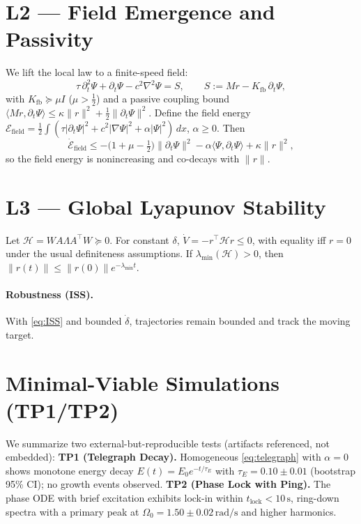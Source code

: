 \documentclass[12pt,a4paper]{article}
\begin{document}
\section{L2 --- Field Emergence and Passivity}
We lift the local law to a finite-speed field:
\begin{equation}\label{eq:telegraph}
\boxed{\tau\,\partial_t^2\Psi + \partial_t\Psi - c^2\nabla^2\Psi = S,\qquad
S:= M r - K_{\mathrm{fb}}\,\partial_t\Psi,}
\end{equation}
with \(K_{\mathrm{fb}}\succeq\mu I\) (\(\mu>\tfrac12\)) and a passive coupling bound
\(\langle Mr,\partial_t\Psi\rangle\le \kappa\|r\|^2 + \tfrac12\|\partial_t\Psi\|^2\).
Define the field energy
\(\mathcal{E}_{\text{field}}=\tfrac12\int(\tau|\partial_t\Psi|^2+c^2|\nabla\Psi|^2+\alpha|\Psi|^2)\,dx\), \(\alpha\ge0\).
Then
\begin{equation}
\dot{\mathcal{E}}_{\text{field}}\le -\big(1+\mu-\tfrac12\big)\|\partial_t\Psi\|^2 - \alpha\langle\Psi,\partial_t\Psi\rangle + \kappa\|r\|^2,
\end{equation}
so the field energy is nonincreasing and co-decays with \(\|r\|\).

\section{L3 --- Global Lyapunov Stability}
Let \(\mathcal{H}=W A \Lambda A^\top W\succeq0\). For constant \(\delta\),
\(\dot V=-r^\top\mathcal{H}r\le0\), with equality iff \(r=0\) under the usual definiteness assumptions.
If \(\lambda_{\min}(\mathcal{H})>0\), then \(\|r(t)\|\le \|r(0)\|e^{-\lambda_{\min}t}\).

\paragraph{Robustness (ISS).} With \eqref{eq:ISS} and bounded \(\dot\delta\), trajectories remain bounded and track the moving target.

\section{Minimal-Viable Simulations (TP1/TP2)}
\label{sec:sim}
We summarize two external-but-reproducible tests (artifacts referenced, not embedded):
\textbf{TP1 (Telegraph Decay).}
Homogeneous \eqref{eq:telegraph} with \(\alpha=0\) shows monotone energy decay \(E(t)=E_0e^{-t/\tau_E}\) with
\(\tau_E=0.10\pm0.01\) (bootstrap 95\% CI); no growth events observed.
\textbf{TP2 (Phase Lock with Ping).}
The phase ODE with brief excitation exhibits lock-in within \(t_{\text{lock}}<10\,\mathrm{s}\),
ring-down spectra with a primary peak at \(\Omega_0=1.50\pm0.02\,\mathrm{rad/s}\) and higher harmonics.
\medskip
\end{document}
